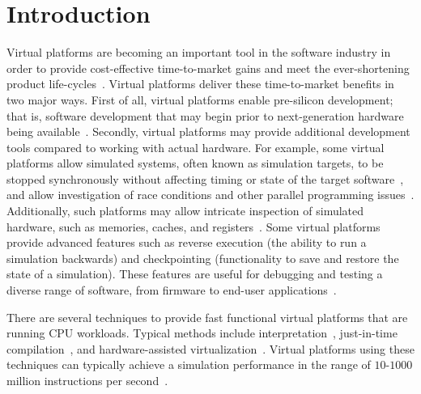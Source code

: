 
\section{Introduction}
\label{sec:introduction}
Virtual platforms are becoming an important tool in the software industry in order to provide cost-effective time-to-market gains and meet the ever-shortening product life-cycles~\cite{journals:magnusson:2002, journals:yi:2006, publications:leupers:2010, publications:aarno:2014}.
Virtual platforms deliver these time-to-market benefits in two major ways.
First of all, virtual platforms enable pre-silicon development; that is, software development that may begin prior to next-generation hardware being available~.
Secondly, virtual platforms may provide additional development tools compared to working with actual hardware.
For example, some virtual platforms allow simulated systems, often known as simulation targets, to be stopped synchronously without affecting timing or state of the target software~, and allow investigation of race conditions and other parallel programming issues~.
Additionally, such platforms may allow intricate inspection of simulated hardware, such as memories, caches, and registers~.
Some virtual platforms provide advanced features such as reverse execution (the ability to run a simulation backwards) and checkpointing (functionality to save and restore the state of a simulation).
These features are useful for debugging and testing a diverse range of software, from firmware to end-user applications~.

There are several techniques to provide fast functional virtual platforms that are running CPU workloads.
Typical methods include interpretation~, just-in-time compilation~, and hardware-assisted virtualization~.
Virtual platforms using these techniques can typically achieve a simulation performance in the range of $10$-$1000$ million instructions per second~.

